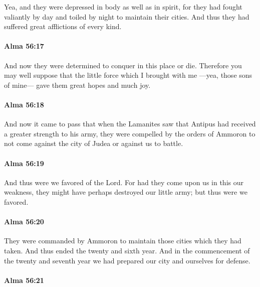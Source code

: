 			Yea, and they were depressed in body as well as in spirit,
			for they had fought valiantly by day and toiled by night to maintain their cities.
			And thus they had suffered great afflictions of every kind.

		\paragraph{Alma 56:17} %
			\label{ALMA-56-17}

			And now they were determined to conquer in this place or die.
			Therefore you may well suppose
			that the little force which I brought with me
			---yea, those sons of mine---
			gave them great hopes and much joy.

		\paragraph{Alma 56:18} %
			\label{ALMA-56-18}

			And now it came to pass that
			when the Lamanites saw that Antipus had received a greater strength to his army,
			they were compelled by the orders of Ammoron
			to not come against the city of Judea or against us to battle.

		\paragraph{Alma 56:19} %
			\label{ALMA-56-19}

			And thus were we favored of the Lord.
			For had they come upon us in this our weakness,
			they might have perhaps destroyed our little army;
			but thus were we favored.

		\paragraph{Alma 56:20} %
			\label{ALMA-56-20}

			They were commanded by Ammoron
			to maintain those cities which they had taken.
			And thus ended the twenty and sixth year.
			And in the commencement of the twenty and seventh year
			we had prepared our city and ourselves for defense.

		\paragraph{Alma 56:21} %
			\label{ALMA-56-21}

